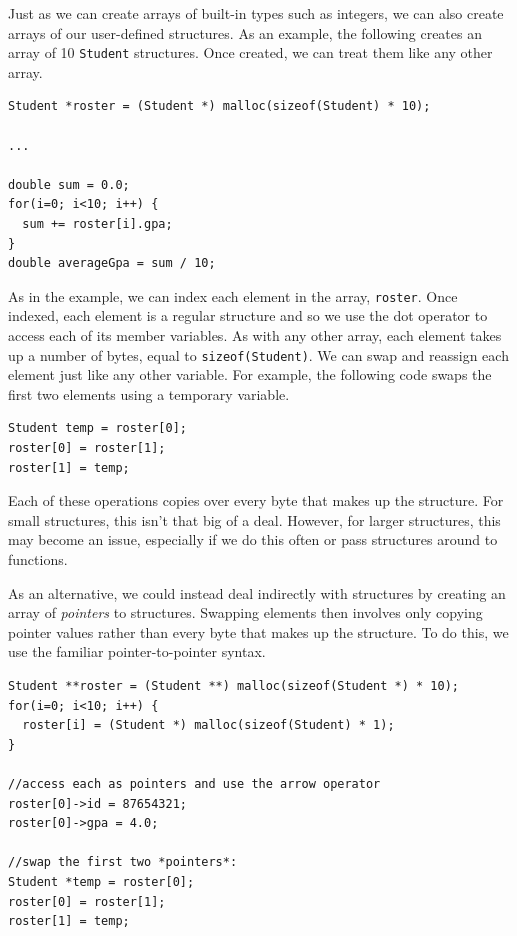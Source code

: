Just as we can create arrays of built-in types such as integers, 
we can also create arrays of our user-defined structures.  As
an example, the following creates an array of 10 \texttt{Student}
structures.  Once created, we can treat them like any other
array.  

\begin{verbatim}
Student *roster = (Student *) malloc(sizeof(Student) * 10);

...

double sum = 0.0;
for(i=0; i<10; i++) {
  sum += roster[i].gpa;
}
double averageGpa = sum / 10;
\end{verbatim}

As in the example, we can index each element in the array, 
\texttt{roster}.  Once indexed, each element is a 
regular structure and so we use the dot operator to access
each of its member variables.  As with any other array, 
each element takes up a number of bytes, equal to 
\texttt{sizeof(Student)}.  We can swap and reassign
each element just like any other variable.  For example, 
the following code swaps the first two elements using
a temporary variable.

\begin{verbatim}
Student temp = roster[0];
roster[0] = roster[1];
roster[1] = temp;
\end{verbatim}

Each of these operations copies over every byte that makes up
the structure.  For small structures, this isn't that big of
a deal.  However, for larger structures, this may become an
issue, especially if we do this often or pass structures around
to functions.

As an alternative, we could instead deal indirectly with structures
by creating an array of \emph{pointers} to structures.  Swapping
elements then involves only copying pointer values rather than
every byte that makes up the structure.  To do this, we use
the familiar pointer-to-pointer syntax.

\begin{verbatim}
Student **roster = (Student **) malloc(sizeof(Student *) * 10);
for(i=0; i<10; i++) {
  roster[i] = (Student *) malloc(sizeof(Student) * 1);
}

//access each as pointers and use the arrow operator
roster[0]->id = 87654321;
roster[0]->gpa = 4.0;

//swap the first two *pointers*:
Student *temp = roster[0];
roster[0] = roster[1];
roster[1] = temp;
\end{verbatim}

